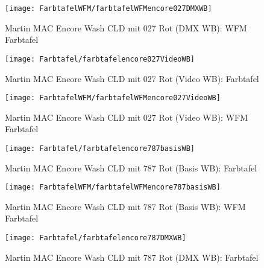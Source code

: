 \documentclass[pagesize,paper=A4,fontsize=12pt,utf8,numbers=noenddot,bibliography=totoc,listof=totoc,DIV=11,BCOR=1mm]{scrreprt}
\begin{document}
\begin{figure}[htp]     %
\centering
\texttt{[image: FarbtafelWFM/farbtafelWFMencore027DMXWB]} 
\caption {Martin MAC Encore Wash CLD mit 027 Rot (DMX WB): WFM Farbtafel} 
\end{figure}

\begin{figure}[htp]     %
\centering
\texttt{[image: Farbtafel/farbtafelencore027VideoWB]} 
\caption {Martin MAC Encore Wash CLD mit 027 Rot (Video WB): Farbtafel} 
\end{figure}

\begin{figure}[htp]     %
\centering
\texttt{[image: FarbtafelWFM/farbtafelWFMencore027VideoWB]} 
\caption {Martin MAC Encore Wash CLD mit 027 Rot (Video WB): WFM Farbtafel} 
\end{figure}



\begin{figure}[htp]     %
\centering
\texttt{[image: Farbtafel/farbtafelencore787basisWB]} 
\caption {Martin MAC Encore Wash CLD mit 787 Rot (Basis WB): Farbtafel} 
\end{figure}

\begin{figure}[htp]     %
\centering
\texttt{[image: FarbtafelWFM/farbtafelWFMencore787basisWB]} 
\caption {Martin MAC Encore Wash CLD mit 787 Rot (Basis WB): WFM Farbtafel} 
\end{figure}

\begin{figure}[htp]     %
\centering
\texttt{[image: Farbtafel/farbtafelencore787DMXWB]} 
\caption {Martin MAC Encore Wash CLD mit 787 Rot (DMX WB): Farbtafel} 
\end{figure}
\end{document}
